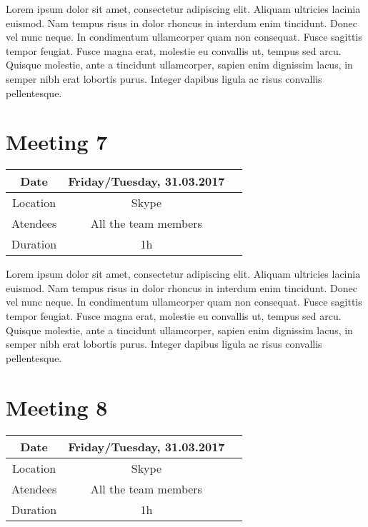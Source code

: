 Lorem ipsum dolor sit amet, consectetur adipiscing elit. Aliquam ultricies lacinia euismod. Nam tempus risus in dolor rhoncus in interdum enim tincidunt. Donec vel nunc neque. In condimentum ullamcorper quam non consequat. Fusce sagittis tempor feugiat. Fusce magna erat, molestie eu convallis ut, tempus sed arcu. Quisque molestie, ante a tincidunt ullamcorper, sapien enim dignissim lacus, in semper nibh erat lobortis purus. Integer dapibus ligula ac risus convallis pellentesque.

\section{Meeting 7}
\begin{center}
	\begin{tabular}{| c | c | c }
		\hline
		Date & Friday/Tuesday, 	31.03.2017   \\
		\hline
		Location & Skype  \\  
		\hline
		Atendees & All the team members   \\
		\hline
		Duration & 1h  \\
		\hline
	\end{tabular}	
\end{center}


Lorem ipsum dolor sit amet, consectetur adipiscing elit. Aliquam ultricies lacinia euismod. Nam tempus risus in dolor rhoncus in interdum enim tincidunt. Donec vel nunc neque. In condimentum ullamcorper quam non consequat. Fusce sagittis tempor feugiat. Fusce magna erat, molestie eu convallis ut, tempus sed arcu. Quisque molestie, ante a tincidunt ullamcorper, sapien enim dignissim lacus, in semper nibh erat lobortis purus. Integer dapibus ligula ac risus convallis pellentesque.

\section{Meeting 8}
\begin{center}
	\begin{tabular}{| c | c | c }
		\hline
		Date & Friday/Tuesday, 	31.03.2017   \\
		\hline
		Location & Skype  \\  
		\hline
		Atendees & All the team members   \\
		\hline
		Duration & 1h  \\
		\hline
	\end{tabular}	
\end{center}


